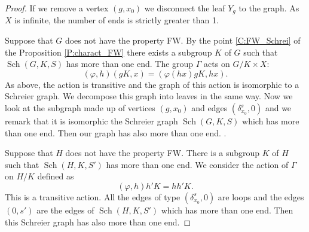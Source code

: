 \documentclass[a4paper]{article}
\theoremstyle{remark}%
\DeclareMathOperator\Sch{Sch}
\renewcommand*{\phi}{\varphi}
\begin{document}
\begin{proof}
If we remove a vertex $(g,x_0)$ we disconnect the leaf $Y_g$ to the graph. As $X$ is infinite, the number of ends is strictly greater than 1.

Suppose that $G$ does not have the property FW. By the point \ref{C:FW_Schrei} of the Proposition \ref{P:charact_FW} there exists a subgroup $K$ of $G$ such that $\Sch(G,K,S)$ has more than one end. The group $\Gamma$ acts on $G/K \times X$:  
\begin{equation*}
(\phi,h)(gK,x) = (\phi(hx) gK, hx).
\end{equation*}
As above, the action is transitive and the graph of this action is isomorphic to a Schreier graph. We decompose this graph into leaves in the same way. Now we look at the subgraph made up of vertices $(g,x_0)$ and edges $(\delta_{x_0}^s,0)$ and we remark that it is isomorphic the Schreier graph $\Sch(G,K,S)$ which has more than one end. Then our graph has also more than one end.
.


Suppose that $H$ does not have the property FW. There is a subgroup $K$ of $H$ such that $\Sch(H,K,S')$ has more than one end. We consider the action of $\Gamma$ on $H/K$ defined as
\begin{equation*}
 (\phi,h)h'K = hh'K.
\end{equation*}
This is a transitive action. All the edges of type $(\delta_{x_0}^s, 0)$ are loops and the edges $(0, s')$ are the edges of $\Sch(H,K,S')$ which has more than one end. Then this Schreier graph has also more than one end.
\end{proof}















\enddocument
\end{document}
